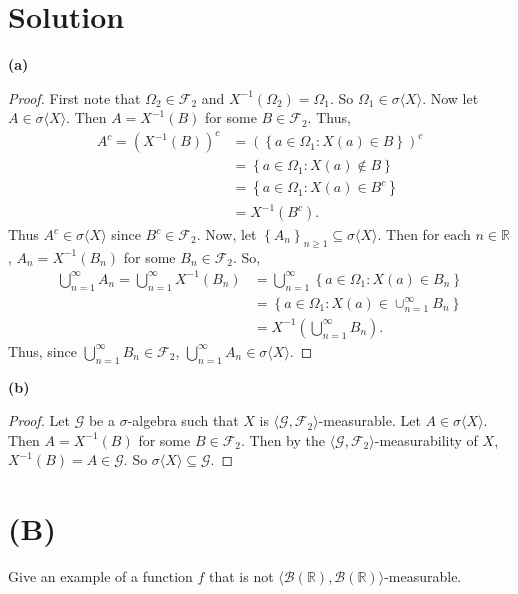\documentclass[12pt]{article}
\begin{document}
\section*{Solution}
{\bf (a)} 
\begin{proof}
First note that $\Omega_{2} \in \mathcal{F}_{2}$ and $X^{-1}(\Omega_{2}) = \Omega_{1}$. So $\Omega_{1} \in \sigma \langle X \rangle$. Now let $A \in
\sigma \langle X \rangle$. Then $A = X^{-1}(B)$ for some $B \in \mathcal{F}_{2}$. Thus,
\begin{align*}
A^{c} = \left( X^{-1}(B) \right)^{c} & = \left( \left\{ a \in \Omega_1 : X(a) \in B \right\} \right)^{c} \\
& = \left\{ a \in \Omega_1 : X(a) \notin B \right\} \\
& = \left\{ a \in \Omega_1 : X(a) \in B^{c} \right\} \\
& = X^{-1}(B^{c}).
\end{align*}
Thus $A^{c} \in \sigma\langle X\rangle$ since $B^{c} \in \mathcal{F}_{2}$. Now, let $\left\{ A_{n} \right\}_{n\geq 1} \subseteq \sigma\langle
X\rangle$. Then for each $n \in \mathbb{R}$, $A_{n} = X^{-1}(B_{n})$ for some $B_{n} \in \mathcal{F}_{2}$. So,
\begin{align*}
\bigcup_{n=1}^{\infty}A_{n} = \bigcup_{n=1}^{\infty}X^{-1}(B_{n}) & = \bigcup_{n=1}^{\infty}\left\{ a \in \Omega_{1} : X(a) \in B_{n} \right\} \\
& = \left\{ a \in \Omega_{1} : X(a) \in \cup_{n=1}^{\infty}B_{n} \right\} \\
& = X^{-1}\left( \bigcup_{n=1}^{\infty}B_{n} \right).
\end{align*}
Thus, since $\bigcup_{n=1}^{\infty}B_n \in \mathcal{F}_{2}$, $\bigcup_{n=1}^{\infty}A_{n} \in \sigma\langle X\rangle$.
\end{proof}

{\bf (b)}
\begin{proof}
Let $\mathcal{G}$ be a $\sigma$-algebra such that $X$ is $\langle \mathcal{G}, \mathcal{F}_{2}\rangle$-measurable. Let $A \in \sigma\langle X\rangle$.
Then $A = X^{-1}(B)$ for some $B\in \mathcal{F}_{2}$. Then by the $\langle \mathcal{G}, \mathcal{F}_{2}\rangle$-measurability of $X$, $X^{-1}(B) = A
\in \mathcal{G}$. So $\sigma\langle X\rangle \subseteq \mathcal{G}$.
\end{proof}


\newpage
\section*{(B)}
Give an example of a function $f$ that is not $\langle\mathcal{B}(\mathbb{R}), \mathcal{B}(\mathbb{R})\rangle$-measurable.
\end{document}
